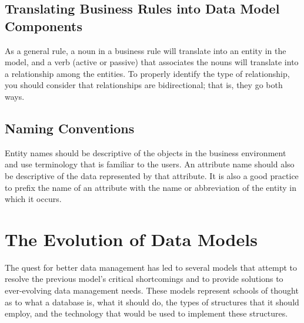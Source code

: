 \documentclass[a4paper, 12pt, titlepage]{report}
\begin{document}
\subsection{Translating Business Rules into Data Model Components}
As a general rule, a noun in a business rule will translate into an entity in the model, and a verb (active or passive) that associates the nouns will translate into a relationship among the entities. To properly identify the type of relationship, you should consider that relationships are bidirectional; that is, they go both ways.
\subsection{Naming Conventions}
Entity names should be descriptive of the objects in the business environment and use terminology that is familiar to the users. An attribute name should also be descriptive of the data represented by that attribute. It is also a good practice to prefix the name of an attribute with the name or abbreviation of the entity in which it occurs.
\section{The Evolution of Data Models}
The quest for better data management has led to several models that attempt to resolve the previous model’s critical shortcomings and to provide solutions to ever-evolving data management needs. These models represent schools of thought as to what a database is, what it should do, the types of structures that it should employ, and the technology that would be used to implement these structures.
\end{document}
